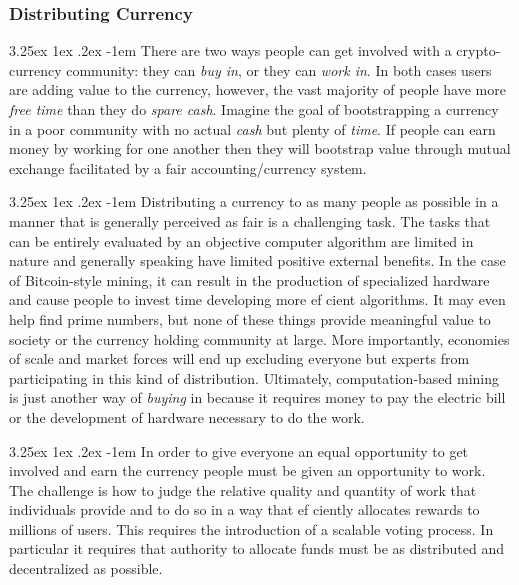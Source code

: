 \documentclass{article}
\makeatletter
\renewcommand\paragraph{\@startsection{paragraph}{5}{\z@}%
  {3.25ex \@plus1ex \@minus.2ex}%
  {-1em}%
  {\normalfont\normalsize\bfseries}}
\makeatother
\begin{document}
			\subsubsection{Distributing Currency}

				\paragraph{}
					There are two ways people can get involved with a crypto-currency community: they can \textit{buy in}, or they can \textit{work in}. In both cases users are adding value to the currency, however, the vast majority of people have more \textit{free time} than they do \textit{spare cash}. Imagine the goal of bootstrapping a currency in a poor community with no actual \textit{cash} but plenty of \textit{time}. If people can earn money by working for one another then they will bootstrap value through mutual exchange facilitated by a fair accounting/currency system.

				\paragraph{}
					Distributing a currency to as many people as possible in a manner that is generally perceived as fair is a challenging task. The tasks that can be entirely evaluated by an objective computer algorithm are limited in nature and generally speaking have limited positive external benefits. In the case of Bitcoin-style mining, it can result in the production of specialized hardware and cause people to invest time developing more ef cient algorithms. It may even help find prime numbers, but none of these things provide meaningful value to society or the currency holding community at large. More importantly, economies of scale and market forces will end up excluding everyone but experts from participating in this kind of distribution. Ultimately, computation-based mining is just another way of \textit{buying} in because it requires money to pay the electric bill or the development of hardware necessary to do the work.

				\paragraph{}
					In order to give everyone an equal opportunity to get involved and earn the currency people must be given an opportunity to work. The challenge is how to judge the relative quality and quantity of work that individuals provide and to do so in a way that ef ciently allocates rewards to millions of users. This requires the introduction of a scalable voting process. In particular it requires that authority to allocate funds must be as distributed and decentralized as possible.
\end{document}
